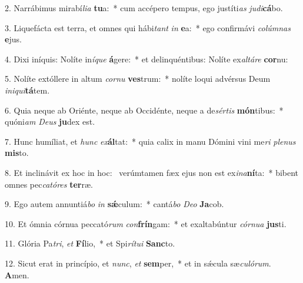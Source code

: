 2. Narrábimus mirabí\textit{li}\textit{a} \textbf{tu}a:~*  cum accépero tempus, ego justíti\textit{as} \textit{ju}\textit{di}\textbf{cá}bo.\

3. Liquefácta est terra, et omnes qui hábi\textit{tant} \textit{in} \textbf{e}a:~*  ego confirmávi \textit{co}\textit{lúm}\textit{nas} \textbf{e}jus.\

4. Dixi iníquis: Nolíte in\textit{í}\textit{que} \textbf{á}gere:~*  et delinquéntibus: Nolíte ex\textit{al}\textit{tá}\textit{re} \textbf{cor}nu:\

5. Nolíte extóllere in altum \textit{cor}\textit{nu} \textbf{ves}trum:~*  nolíte loqui advérsus Deum \textit{in}\textit{i}\textit{qui}\textbf{tá}tem.\

6. Quia neque ab Oriénte, neque ab Occidénte, neque a de\textit{sér}\textit{tis} \textbf{món}tibus:~*  quóni\textit{am} \textit{De}\textit{us} \textbf{ju}dex est.\

7. Hunc humíliat, et \textit{hunc} \textit{ex}\textbf{ál}tat:~*  quia calix in manu Dómini vini me\textit{ri} \textit{ple}\textit{nus} \textbf{mis}to.\

8. Et inclinávit ex hoc in hoc: \dag\  verúmtamen fæx ejus non est ex\textit{i}\textit{na}\textbf{ní}ta:~*  bibent omnes pec\textit{ca}\textit{tó}\textit{res} \textbf{ter}ræ.\

9. Ego autem annuntiá\textit{bo} \textit{in} \textbf{sǽ}culum:~*  cantá\textit{bo} \textit{De}\textit{o} \textbf{Ja}cob.\

10. Et ómnia córnua peccató\textit{rum} \textit{con}\textbf{frín}gam:~*  et exaltabúntur \textit{cór}\textit{nu}\textit{a} \textbf{jus}ti.\

11. Glória Pa\textit{tri}, \textit{et} \textbf{Fí}lio,~*  et Spi\textit{rí}\textit{tu}\textit{i} \textbf{Sanc}to.\

12. Sicut erat in princípio, et \textit{nunc}, \textit{et} \textbf{sem}per,~*  et in sǽcula sæ\textit{cu}\textit{ló}\textit{rum}. \textbf{A}men.\

